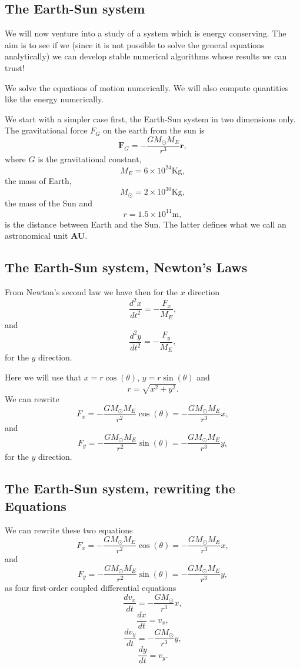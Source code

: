\documentclass[%
oneside,                 %
final,                   %
10pt]{article}
\begin{document}
\subsection*{The Earth-Sun system}

We will now venture into a study of a system which is energy
conserving. The aim is to see if we (since it is not possible to solve
the general equations analytically) we can develop stable numerical
algorithms whose results we can trust!

We solve the equations of motion numerically. We will also compute
quantities like the energy numerically.

We start with a simpler case first, the Earth-Sun system  in two dimensions only.  The gravitational force $F_G$ on the earth from the sun is  
\[
\bm{F}_G=-\frac{GM_{\odot}M_E}{r^3}\bm{r},
\]
where $G$ is the gravitational constant, 
\[
M_E=6\times 10^{24}\mathrm{Kg},
\]
the mass of Earth, 
\[
M_{\odot}=2\times 10^{30}\mathrm{Kg}, 
\]
the mass of the Sun and 
\[
r=1.5\times 10^{11}\mathrm{m}, 
\]
is the distance between Earth and the Sun. The latter defines what we call an astronomical unit \textbf{AU}.

\subsection*{The Earth-Sun system, Newton's Laws}

From Newton's second law we have then for the $x$ direction
\[
\frac{d^2x}{dt^2}=-\frac{F_{x}}{M_E},
\]
and
\[
\frac{d^2y}{dt^2}=-\frac{F_{y}}{M_E},
\]
for the $y$ direction.

Here we will use  that  $x=r\cos{(\theta)}$, $y=r\sin{(\theta)}$ and
\[
r = \sqrt{x^2+y^2}.
\]
We can rewrite 
\[
F_{x}=-\frac{GM_{\odot}M_E}{r^2}\cos{(\theta)}=-\frac{GM_{\odot}M_E}{r^3}x,
\]
and
\[
F_{y}=-\frac{GM_{\odot}M_E}{r^2}\sin{(\theta)}=-\frac{GM_{\odot}M_E}{r^3}y,
\]
for the $y$ direction.

\subsection*{The Earth-Sun system, rewriting the Equations}

We can rewrite these two equations
\[
F_{x}=-\frac{GM_{\odot}M_E}{r^2}\cos{(\theta)}=-\frac{GM_{\odot}M_E}{r^3}x,
\]
and
\[
F_{y}=-\frac{GM_{\odot}M_E}{r^2}\sin{(\theta)}=-\frac{GM_{\odot}M_E}{r^3}y,
\]
as four first-order coupled differential equations
\[
\frac{dv_x}{dt}=-\frac{GM_{\odot}}{r^3}x,
\]
\[
\frac{dx}{dt}=v_x,
\]
\[
\frac{dv_y}{dt}=-\frac{GM_{\odot}}{r^3}y,
\]
\[
\frac{dy}{dt}=v_y.
\]
\end{document}
